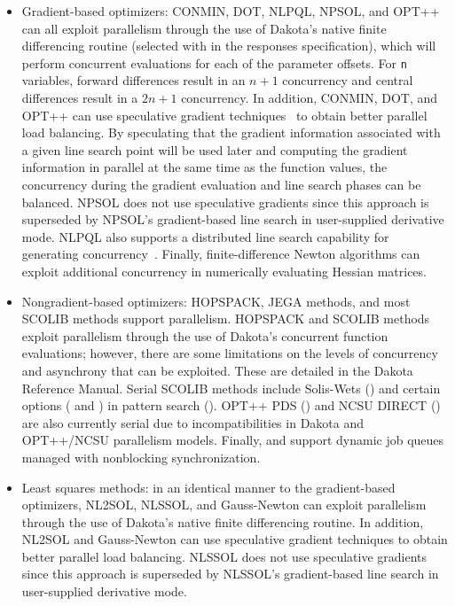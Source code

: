 \begin{itemize}
\item Gradient-based optimizers: CONMIN, DOT, NLPQL, NPSOL, and OPT++
  can all exploit parallelism through the use of Dakota's native finite
  differencing routine (selected with  
  in the responses specification), which will perform concurrent
  evaluations for each of the parameter offsets. For \texttt{n}
  variables, forward differences result in an $n+1$ concurrency and
  central differences result in a $2n+1$ concurrency. In addition,
  CONMIN, DOT, and OPT++ can use speculative gradient
  techniques~\cite{Byr88} to obtain better parallel load balancing. By
  speculating that the gradient information associated with a given
  line search point will be used later and computing the gradient
  information in parallel at the same time as the function values, the
  concurrency during the gradient evaluation and line search phases
  can be balanced. NPSOL does not use speculative gradients since this
  approach is superseded by NPSOL's gradient-based line search in
  user-supplied derivative mode.  NLPQL also supports a distributed
  line search capability for generating concurrency~\cite{Sch04}.
  Finally, finite-difference Newton algorithms can exploit additional
  concurrency in numerically evaluating Hessian matrices. %

\item Nongradient-based optimizers: HOPSPACK, JEGA methods, and most
  SCOLIB methods support parallelism.  HOPSPACK and SCOLIB methods
  exploit parallelism through the use of Dakota's concurrent function
  evaluations; however, there are some limitations on the levels of
  concurrency and asynchrony that can be exploited.  These are detailed
  in the Dakota Reference Manual. Serial SCOLIB methods include
  Solis-Wets () and certain
   options ( and
  ) in pattern search
  ().  OPT++ PDS ()
  and NCSU DIRECT () are also currently serial
  due to incompatibilities in Dakota and OPT++/NCSU parallelism
  models.  Finally,  and
   support dynamic job queues managed
  with nonblocking synchronization.

\item Least squares methods: in an identical manner to the
  gradient-based optimizers, NL2SOL, NLSSOL, and Gauss-Newton can
  exploit parallelism through the use of Dakota's native finite
  differencing routine. In addition, NL2SOL and Gauss-Newton can use
  speculative gradient techniques to obtain better parallel load
  balancing. NLSSOL does not use speculative gradients since this
  approach is superseded by NLSSOL's gradient-based line search in
  user-supplied derivative mode.


\end{itemize}
